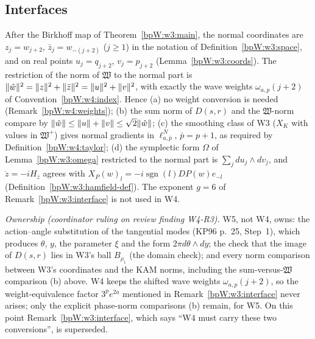 \subsection{Interfaces}\label{bpW:w4:interface-sec}

\begin{remark}[From W3]\label{bpW:w4:from-w3}
After the Birkhoff map of Theorem~\ref{bpW:w3:main}, the normal coordinates are $z_j=w_{j+2}$, $\bar z_j=w_{-(j+2)}$
($j\ge1$) in the notation of Definition~\ref{bpW:w3:space}, and on real points $u_j=q_{j+2}$, $v_j=p_{j+2}$
(Lemma~\ref{bpW:w3:coords}). The restriction of the norm of $\mathfrak W$ to the normal part is
$\lVert \hat w\rVert^2=\lVert z\rVert^2+\lVert \bar z\rVert^2=\lVert u\rVert^2+\lVert v\rVert^2$, with exactly the wave weights $\omega_{a,p}(j+2)$ of
Convention~\ref{bpW:w4:index}. Hence (a) no weight conversion is needed (Remark~\ref{bpW:w4:weights}); (b) the sum
norm of $D(s,r)$ and the $\mathfrak W$-norm compare by $\lVert \hat w\rVert\le\lVert u\rVert+\lVert v\rVert\le\sqrt2\lVert \hat w\rVert$; (c) the
smoothing class of W3 ($X_K$ with values in $\mathfrak W^+$) gives normal gradients in $\ell^N_{a,\bar p}$, $\bar p=p+1$, as
required by Definition~\ref{bpW:w4:taylor}; (d) the symplectic form $\Omega$ of Lemma~\ref{bpW:w3:omega} restricted to
the normal part is $\sum_jdu_j\wedge dv_j$, and $\dot z=-iH_{\bar z}$ agrees with $X_P(w)_l=-i\operatorname{sgn}(l)DP(w)e_{-l}$
(Definition~\ref{bpW:w3:hamfield-def}). The exponent $g=6$ of Remark~\ref{bpW:w3:interface} is not used in W4.

\emph{Ownership (coordinator ruling on review finding W4-R3).} W5, not W4, owns: the action--angle substitution of the
tangential modes (KP96 p.~25, Step~1), which produces $\theta$, $y$, the parameter $\xi$ and the form
$2\pi d\theta\wedge dy$; the check that the image of $D(s,r)$ lies in W3's ball $B_{\rho_1}$ (the domain check); and every
norm comparison between W3's coordinates and the KAM norms, including the sum-versus-$\mathfrak W$ comparison (b)
above. W4 keeps the shifted wave weights $\omega_{a,p}(j+2)$, so the weight-equivalence factor $3^pe^{2a}$ mentioned
in Remark~\ref{bpW:w3:interface} never arises; only the explicit phase-norm comparisons (b) remain, for W5. On this
point Remark~\ref{bpW:w3:interface}, which says ``W4 must carry these two conversions'', is superseded.
\end{remark}

